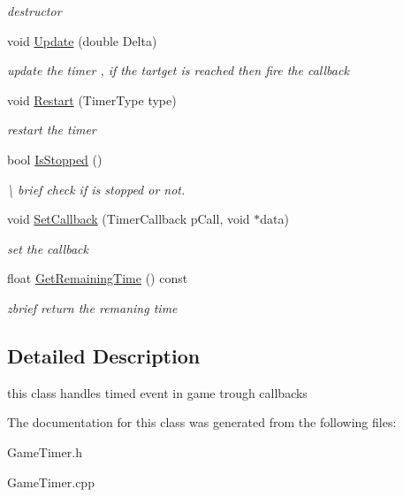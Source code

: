 \begin{DoxyCompactItemize}
\begin{DoxyCompactList}\small\item\em destructor \end{DoxyCompactList}\item 
\hypertarget{class_game_timer_a3ab92af177943faf97d1a39b1e2e499e}{void \hyperlink{class_game_timer_a3ab92af177943faf97d1a39b1e2e499e}{Update} (double Delta)}\label{class_game_timer_a3ab92af177943faf97d1a39b1e2e499e}

\begin{DoxyCompactList}\small\item\em update the timer , if the tartget is reached then fire the callback \end{DoxyCompactList}\item 
\hypertarget{class_game_timer_ad940d8204935aad3d426445730051211}{void \hyperlink{class_game_timer_ad940d8204935aad3d426445730051211}{Restart} (Timer\-Type type)}\label{class_game_timer_ad940d8204935aad3d426445730051211}

\begin{DoxyCompactList}\small\item\em restart the timer \end{DoxyCompactList}\item 
\hypertarget{class_game_timer_ad038edc06eb4f8c14ac800bef6f4abf8}{bool \hyperlink{class_game_timer_ad038edc06eb4f8c14ac800bef6f4abf8}{Is\-Stopped} ()}\label{class_game_timer_ad038edc06eb4f8c14ac800bef6f4abf8}

\begin{DoxyCompactList}\small\item\em \textbackslash{} brief check if is stopped or not. \end{DoxyCompactList}\item 
\hypertarget{class_game_timer_a694db1040230e8dc1cce8ac4f9524613}{void \hyperlink{class_game_timer_a694db1040230e8dc1cce8ac4f9524613}{Set\-Callback} (Timer\-Callback p\-Call, void $\ast$data)}\label{class_game_timer_a694db1040230e8dc1cce8ac4f9524613}

\begin{DoxyCompactList}\small\item\em set the callback \end{DoxyCompactList}\item 
\hypertarget{class_game_timer_a9b4b1efa1f07a63e448a53902371c538}{float \hyperlink{class_game_timer_a9b4b1efa1f07a63e448a53902371c538}{Get\-Remaining\-Time} () const }\label{class_game_timer_a9b4b1efa1f07a63e448a53902371c538}

\begin{DoxyCompactList}\small\item\em zbrief return the remaning time \end{DoxyCompactList}\end{DoxyCompactItemize}


\subsection{Detailed Description}
this class handles timed event in game trough callbacks 

The documentation for this class was generated from the following files\-:\begin{DoxyCompactItemize}
\item 
Game\-Timer.\-h\item 
Game\-Timer.\-cpp\end{DoxyCompactItemize}
